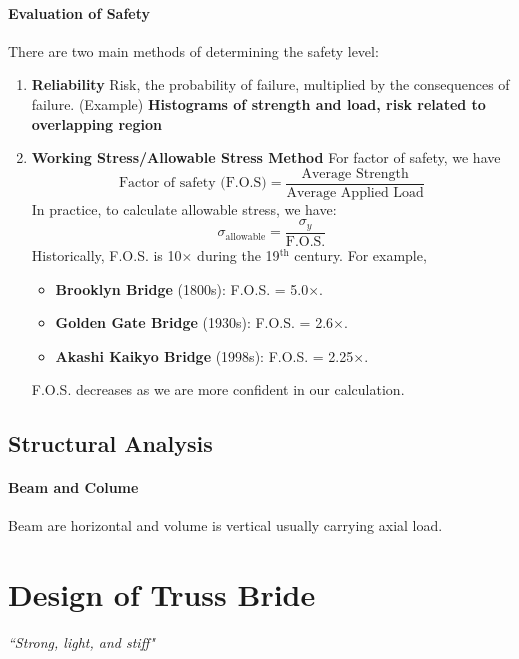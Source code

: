 \paragraph{Evaluation of Safety} There are two main methods of determining the safety level:
\begin{enumerate}
    \item \textbf{Reliability} Risk, the probability of failure, multiplied by the consequences of failure.
    (Example) \textbf{Histograms of strength and load, risk related to overlapping region}
    \item \textbf{Working Stress/Allowable Stress Method} For factor of safety, we have
    \begin{equation}
        \text{Factor of safety (F.O.S)}=\frac{\text{Average Strength}}{\text{Average Applied Load}}
    \end{equation}
    In practice, to calculate allowable stress, we have:
    \begin{equation}
        \sigma_\text{allowable}=\frac{\sigma_y}{\text{F.O.S.}}
    \end{equation}
    Historically, F.O.S. is 10$\times$ during the 19$^\text{th}$ century. For example,
    \begin{itemize}
        \item \textbf{Brooklyn Bridge} (1800s): F.O.S. = 5.0$\times$.
        \item \textbf{Golden Gate Bridge} (1930s): F.O.S. = 2.6$\times$.
        \item \textbf{Akashi Kaikyo Bridge} (1998s): F.O.S. = 2.25$\times$.
    \end{itemize}
    F.O.S. decreases as we are more confident in our calculation. 
\end{enumerate}
\subsection{Structural Analysis}
\paragraph{Beam and Colume} Beam are horizontal and volume is vertical usually carrying axial load. 
\section{Design of Truss Bride}
\begin{center}
    \textit{``Strong, light, and stiff"}
\end{center}
